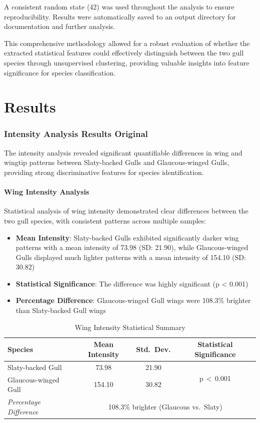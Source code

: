 \documentclass[a4paper,12pt]{report}
\begin{document}
A consistent random state (42) was used throughout the analysis to ensure reproducibility. Results were automatically saved to an output directory for documentation and further analysis.

This comprehensive methodology allowed for a robust evaluation of whether the extracted statistical features could effectively distinguish between the two gull species through unsupervised clustering, providing valuable insights into feature significance for species classification.

\chapter{Results}


\subsection{Intensity Analysis Results Original}

The intensity analysis revealed significant quantifiable differences in wing and wingtip patterns between Slaty-backed Gulls and Glaucous-winged Gulls, providing strong discriminative features for species identification.

\subsubsection{Wing Intensity Analysis}
Statistical analysis of wing intensity demonstrated clear differences between the two gull species, with consistent patterns across multiple samples:

\begin{itemize}
    \item \textbf{Mean Intensity}: Slaty-backed Gulls exhibited significantly darker wing patterns with a mean intensity of 73.98 (SD: 21.90), while Glaucous-winged Gulls displayed much lighter patterns with a mean intensity of 154.10 (SD: 30.82)
    \item \textbf{Statistical Significance}: The difference was highly significant (p < 0.001)
    \item \textbf{Percentage Difference}: Glaucous-winged Gull wings were 108.3\% brighter than Slaty-backed Gull wings
\end{itemize}


\begin{table}[H]
    \centering
    \caption{Wing Intensity Statistical Summary}
    \label{tab:wingintensity-stats}
    \begin{tabular}{lccc}
        \toprule
        Species & Mean Intensity & Std.\ Dev. & Statistical Significance \\
        \midrule
        Slaty-backed Gull & 73.98 & 21.90 & \multirow{2}{*}{p\,$<$\,0.001} \\
        Glaucous-winged Gull & 154.10 & 30.82 & \\
        \textit{Percentage Difference} & \multicolumn{3}{c}{108.3\% brighter (Glaucous vs.\ Slaty)} \\
        \bottomrule
    \end{tabular}
\end{table}
\end{document}
